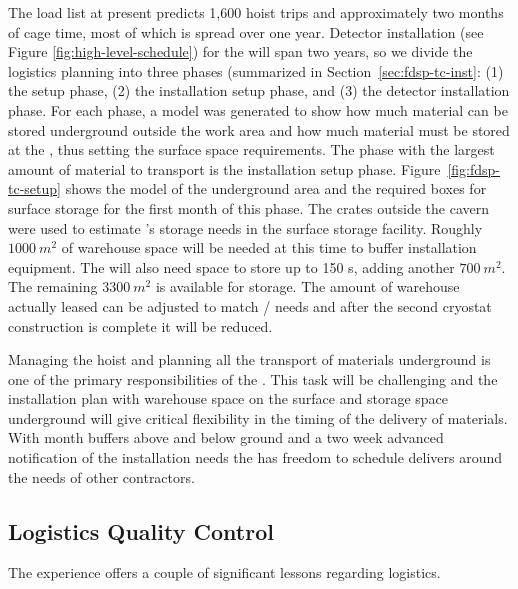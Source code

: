 The load list at present predicts 1,600 hoist trips and approximately two  months of cage time, most of which is spread over one year. 
Detector installation (see Figure \ref{fig:high-level-schedule}) for the  will span two years, so we divide the logistics planning into three phases (summarized in Section~\ref{sec:fdsp-tc-inst}: %
 (1) the  setup phase, (2) the installation setup phase, and (3) the detector installation phase. 
For each phase, a \threed model was generated to show how much material can be stored underground outside the work area and how much material must be stored 
at the , thus setting the surface space requirements. 
The phase with the largest amount of material to transport is the installation setup phase.  
Figure~\ref{fig:fdsp-tc-setup} shows the model of the underground area and the required boxes for surface storage for the first month of this phase. 
The crates outside the cavern were used to estimate 's storage needs in the surface storage facility. Roughly $\SI{1000}{m^2}$ of warehouse space will be needed at this time to buffer  installation equipment.  The  will also need space to store up to 150 s, adding another $\SI{700}{m^2}$. The remaining $\SI{3300}{m^2}$ is available for  storage. The amount of warehouse actually leased can be adjusted to match / needs and after the second cryostat construction is complete it will be reduced. 

Managing the hoist and planning all the transport of materials underground is one of the primary responsibilities of the . This task will be challenging and the installation plan with warehouse space on the surface and storage space underground will give critical flexibility in the timing of the delivery of materials. With month buffers above and below ground and a two week advanced notification of the installation needs the  has freedom to schedule delivers around the needs of other contractors.


\subsection{Logistics Quality Control}
\label{sec:fdsp-tc-log-qaqc}


 
The  experience offers a couple of significant lessons regarding logistics.

